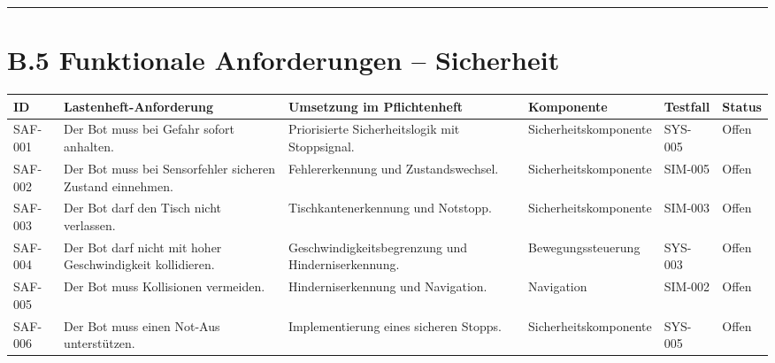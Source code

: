 \documentclass[
  a4paper,
  12pt,
  DIV=12,        %
  parskip=half,  %
  headings=small %
]{scrartcl}
\theoremstyle{definition}
\theoremstyle{definition}
\begin{document}
\begin{center}\rule{0.5\linewidth}{0.5pt}\end{center}

\section{B.5 Funktionale Anforderungen --
Sicherheit}\label{b.5-funktionale-anforderungen-sicherheit}

\begin{longtable}[]{@{}
  >{\raggedright\arraybackslash}p{}
  >{\raggedright\arraybackslash}p{}
  >{\raggedright\arraybackslash}p{}
  >{\raggedright\arraybackslash}p{}
  >{\raggedright\arraybackslash}p{}
  >{\raggedright\arraybackslash}p{}@{}}
\toprule\noalign{}
\begin{minipage}[b]{\linewidth}\raggedright
ID
\end{minipage} & \begin{minipage}[b]{\linewidth}\raggedright
Lastenheft-Anforderung
\end{minipage} & \begin{minipage}[b]{\linewidth}\raggedright
Umsetzung im Pflichtenheft
\end{minipage} & \begin{minipage}[b]{\linewidth}\raggedright
Komponente
\end{minipage} & \begin{minipage}[b]{\linewidth}\raggedright
Testfall
\end{minipage} & \begin{minipage}[b]{\linewidth}\raggedright
Status
\end{minipage} \\
\midrule\noalign{}
\endhead
\bottomrule\noalign{}
\endlastfoot
SAF-001 & Der Bot muss bei Gefahr sofort anhalten. & Priorisierte
Sicherheitslogik mit Stoppsignal. & Sicherheitskomponente & SYS-005 &
Offen \\
SAF-002 & Der Bot muss bei Sensorfehler sicheren Zustand einnehmen. &
Fehlererkennung und Zustandswechsel. & Sicherheitskomponente & SIM-005 &
Offen \\
SAF-003 & Der Bot darf den Tisch nicht verlassen. & Tischkantenerkennung
und Notstopp. & Sicherheitskomponente & SIM-003 & Offen \\
SAF-004 & Der Bot darf nicht mit hoher Geschwindigkeit kollidieren. &
Geschwindigkeitsbegrenzung und Hinderniserkennung. & Bewegungssteuerung
& SYS-003 & Offen \\
SAF-005 & Der Bot muss Kollisionen vermeiden. & Hinderniserkennung und
Navigation. & Navigation & SIM-002 & Offen \\
SAF-006 & Der Bot muss einen Not-Aus unterstützen. & Implementierung
eines sicheren Stopps. & Sicherheitskomponente & SYS-005 & Offen \\
\end{longtable}
\end{document}
